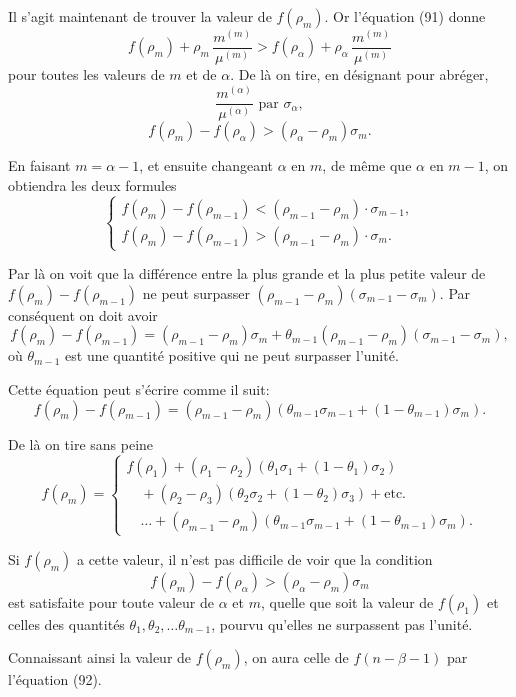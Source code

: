 \documentclass{article}
\begin{document}
Il s'agit maintenant de trouver la valeur de $f(\rho_m)$.
Or l'équation (91) donne
\[ f(\rho_m) + \rho_m\,\frac{m^{(m)}}{\mu^{(m)}} > f(\rho_\alpha) + \rho_\alpha\,\frac{m^{(m)}}{\mu^{(m)}} \tag{93} \]
pour toutes les valeurs de $m$ et de $\alpha$.
De là on tire, en désignant pour abréger,
\[ \frac{m^{(\alpha)}}{\mu^{(\alpha)}} \text{ par } \sigma_\alpha, \tag{94} \]
\[ f(\rho_m) - f(\rho_\alpha) > (\rho_\alpha - \rho_m)\sigma_m. \tag{95} \]

En faisant $m = \alpha-1$, et ensuite changeant $\alpha$ en $m$, de même que $\alpha$ en $m-1$, on obtiendra les deux formules
\[ \begin{cases} f(\rho_m) - f(\rho_{m-1}) < (\rho_{m-1}-\rho_m) \cdot \sigma_{m-1}, \\ f(\rho_m) - f(\rho_{m-1}) > (\rho_{m-1}-\rho_m) \cdot \sigma_m. \end{cases} \tag{96} \]

Par là on voit que la différence entre la plus grande et la plus petite valeur de $f(\rho_m)-f(\rho_{m-1})$ ne peut surpasser $(\rho_{m-1}-\rho_m)(\sigma_{m-1}-\sigma_m)$. Par conséquent on doit avoir
\[ f(\rho_m)-f(\rho_{m-1}) = (\rho_{m-1}-\rho_m)\sigma_m+\theta_{m-1}(\rho_{m-1}-\rho_m)(\sigma_{m-1}-\sigma_m), \]
où $\theta_{m-1}$ est une quantité positive qui ne peut surpasser l'unité.

Cette équation peut s'écrire comme il suit:
\[ f(\rho_m)-f(\rho_{m-1}) = (\rho_{m-1}-\rho_m)\left(\theta_{m-1}\sigma_{m-1}+(1-\theta_{m-1})\sigma_m\right). \tag{97} \]

De là on tire sans peine
\[ f(\rho_m) = \begin{cases}
f(\rho_1)+(\rho_1-\rho_2)\left(\theta_1\sigma_1+(1-\theta_1)\sigma_2\right) \\
\quad + (\rho_2-\rho_3)\left(\theta_2\sigma_2+(1-\theta_2)\sigma_3\right)+\text{etc.} \\
\quad \ldots + (\rho_{m-1}-\rho_m)\left(\theta_{m-1}\sigma_{m-1}+(1-\theta_{m-1})\sigma_m\right).
\end{cases} \tag{98} \]

Si $f(\rho_m)$ a cette valeur, il n'est pas difficile de voir que la condition
\[ f(\rho_m) - f(\rho_\alpha) > (\rho_\alpha-\rho_m)\sigma_m \]
est satisfaite pour toute valeur de $\alpha$ et $m$, quelle que soit la valeur de $f(\rho_1)$ et celles des quantités $\theta_1, \theta_2, \ldots \theta_{m-1}$, pourvu qu'elles ne surpassent pas l'unité.

Connaissant ainsi la valeur de $f(\rho_m)$, on aura celle de $f(n-\beta-1)$ par l'équation (92).
\end{document}
